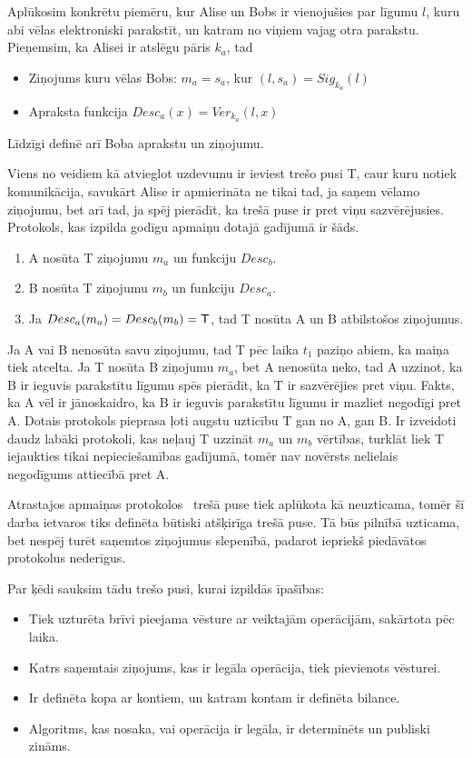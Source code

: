 Aplūkosim konkrētu piemēru, kur Alise un Bobs ir vienojušies par līgumu $l$, kuru abi vēlas elektroniski parakstīt, un katram no viņiem vajag otra parakstu. Pieņemsim, ka Alisei ir atslēgu pāris $k_a$, tad
\begin{itemize}
    \item Ziņojums kuru vēlas Bobs: $m_a = s_a$, kur $(l, s_a) = Sig_{k_a}(l)$
    \item Apraksta funkcija $Desc_a(x) = Ver_{k_a}(l, x)$
\end{itemize}
Līdzīgi definē arī Boba aprakstu un ziņojumu.

Viens no veidiem kā atvieglot uzdevumu ir ieviest trešo pusi T, caur kuru notiek komunikācija, savukārt Alise ir apmierināta ne tikai tad, ja saņem vēlamo ziņojumu, bet arī tad, ja spēj pierādīt, ka trešā puse ir pret viņu sazvērējusies.
Protokols, kas izpilda godīgu apmaiņu dotajā gadījumā ir šāds.
\begin{enumerate}
    \item A nosūta T ziņojumu $m_a$ un funkciju $Desc_b$.
    \item B nosūta T ziņojumu $m_b$ un funkciju $Desc_a$.
    \item Ja $Desc_a(m_a) = Desc_b(m_b) = \textsf{T}$, tad T nosūta A un B atbilstošos ziņojumus.
\end{enumerate}
Ja A vai B nenosūta savu ziņojumu, tad T pēc laika $t_1$ paziņo abiem, ka maiņa tiek atcelta. Ja T nosūta B ziņojumu $m_a$, bet A nenosūta neko, tad A uzzinot, ka B ir ieguvis parakstītu līgumu spēs pierādīt, ka T ir sazvērējies pret viņu. Fakts, ka A vēl ir jānoskaidro, ka B ir ieguvis parakstītu līgumu ir mazliet negodīgi pret A. Dotais protokols pieprasa ļoti augstu uzticību T gan no A, gan B. Ir izveidoti daudz labāki protokoli, kas neļauj T uzzināt $m_a$ un $m_b$ vērtības, turklāt liek T iejaukties tikai nepieciešamības gadījumā, tomēr nav novērsts nelielais negodīgums attiecībā pret A.\cite{asokan98}

Atrastajos apmaiņas protokolos~\cite{asokan98,schunter00}%
trešā puse tiek aplūkota kā neuzticama, tomēr šī darba ietvaros tiks definēta būtiski atšķirīga trešā puse. Tā būs pilnībā uzticama, bet nespēj turēt saņemtos ziņojumus slepenībā, padarot iepriekš piedāvātos protokolus nederīgus.

Par ķēdi sauksim tādu trešo pusi, kurai izpildās īpašības:
\begin{itemize}
    \item Tiek uzturēta brīvi pieejama vēsture ar veiktajām operācijām, sakārtota pēc laika.
    \item Katrs saņemtais ziņojums, kas ir legāla operācija, tiek pievienots vēsturei.
    \item Ir definēta kopa ar kontiem, un katram kontam ir definēta bilance.
    \item Algoritms, kas nosaka, vai operācija ir legāla, ir determinēts un publiski zināms.
\end{itemize}

